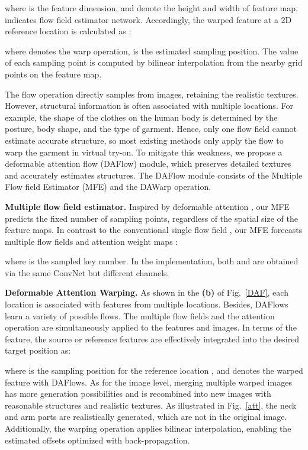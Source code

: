 \documentclass[runningheads]{llncs}
\begin{document}
where  is the feature dimension,  and  denote the height and width of  feature map.   indicates flow field estimator network. Accordingly, the warped feature at a 2D reference location  is calculated as :

where  denotes the warp operation,  is the estimated sampling position. The value  of each sampling point
is computed by bilinear interpolation from the nearby grid
points on the feature map. 

The flow operation directly samples from images, retaining the realistic textures. However, structural information is often associated with multiple locations. For example, the shape of the clothes on the human body is determined by the posture, body shape, and the type of garment. Hence, only one flow field cannot estimate accurate structure, so most existing methods only apply the flow to warp the garment in virtual try-on. To mitigate this weakness, we propose a deformable attention flow (DAFlow) module, which preserves detailed textures and accurately estimates structures. The DAFlow module consists of the Multiple Flow field Estimator (MFE) and the DAWarp operation.

\textbf{Multiple flow field estimator.} Inspired by deformable attention \cite{zhu2020deformable}, our MFE predicts the fixed number  of sampling points, regardless of the spatial size of the feature maps. In contrast to the conventional single flow field , our MFE forecasts multiple flow fields   and attention weight maps :

where  is the sampled key number. In the implementation, both  and  are obtained via the same ConvNet but different channels.


\textbf{Deformable Attention Warping.} 
As shown in the \textbf{(b)} of Fig.~\ref{DAF}, each location is associated with features from multiple locations. Besides, DAFlows learn a variety of possible flows. The multiple flow fields and the attention operation are simultaneously applied to the features and images. In terms of the feature, the source or reference features  are effectively integrated into the desired target position as:

where  is the  sampling position for the reference location , and   denotes the warped feature with DAFlows. As for the image level, merging multiple warped images has more generation possibilities and is recombined into new images with reasonable structures and realistic textures. As illustrated in Fig.~\ref{att}, the neck and arm parts are realistically generated, which are not in the original image. Additionally, the warping operation applies bilinear interpolation, enabling the estimated offsets optimized with back-propagation. 
\end{document}
